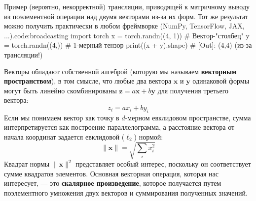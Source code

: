\begin{mypy}{Пример (вероятно, некорректной) трансляции, приводящей к матричному выводу из поэлементной операции над двумя векторами из-за их форм. Тот же результат можно получить практически в любом фреймворке (NumPy, TensorFlow, JAX, ...).}{code:broadcasting}
import torch
x = torch.randn((4, 1))  # Вектор-"столбец"
y = torch.randn((4,))    # 1-мерный тензор
print((x + y).shape)        
# [Out]: (4,4) (из-за трансляции!)
\end{mypy}

Векторы обладают собственной алгеброй (которую мы называем \textbf{векторным пространством}), в том смысле, что любые два вектора $\mathbf{x}$ и $\mathbf{y}$ одинаковой формы могут быть линейно скомбинированы $\mathbf{z} = a\mathbf{x} + b\mathbf{y}$ для получения третьего вектора:
%
$$
z_i=ax_i+by_i
$$
%
Если мы понимаем вектор как точку в $d$-мерном евклидовом пространстве, сумма интерпретируется как построение параллелограмма, а расстояние вектора от начала координат задается евклидовой ($\ell_2$) нормой:
%
$$
\lVert \mathbf{x} \rVert=\sqrt{\sum_i x_i^2}
$$
%
Квадрат нормы $\lVert \mathbf{x} \rVert^2$ представляет особый интерес, поскольку он соответствует сумме квадратов элементов. Основная векторная операция, которая нас интересует, — это \textbf{скалярное произведение}, которое получается путем поэлементного умножения двух векторов и суммирования полученных значений.


